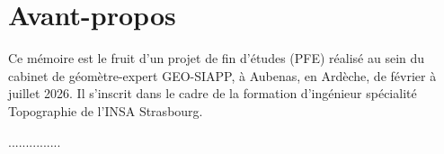 
\section*{Avant-propos}

Ce mémoire est le fruit d'un projet de fin d'études (PFE) réalisé au sein du cabinet de géomètre-expert GEO-SIAPP, à Aubenas, en Ardèche, de février à juillet 2026. Il s'inscrit dans le cadre de la formation d'ingénieur spécialité Topographie de l'INSA Strasbourg.

...............